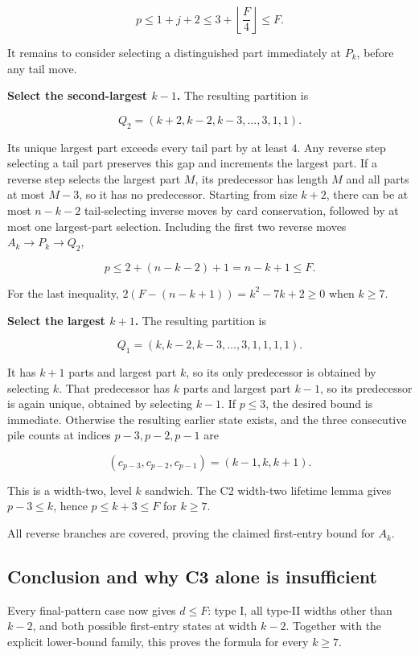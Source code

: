 \documentclass[11pt,a4paper]{article}
\begin{document}
\[
p\le1+j+2\le3+\left\lfloor\frac F4\right\rfloor\le F.
\]

It remains to consider selecting a distinguished part immediately at $P_k$, before any tail move.

\textbf{Select the second-largest $k-1$.} The resulting partition is

\[
Q_2=(k+2,k-2,k-3,\ldots,3,1,1).
\]

Its unique largest part exceeds every tail part by at least $4$. Any reverse step selecting a tail part preserves this gap and increments the largest part. If a reverse step selects the largest part $M$, its predecessor has length $M$ and all parts at most $M-3$, so it has no predecessor. Starting from size $k+2$, there can be at most $n-k-2$ tail-selecting inverse moves by card conservation, followed by at most one largest-part selection. Including the first two reverse moves $A_k\to P_k\to Q_2$,

\[
p\le2+(n-k-2)+1=n-k+1\le F.
\]

For the last inequality, $2(F-(n-k+1))=k^2-7k+2\ge0$ when $k\ge7$.

\textbf{Select the largest $k+1$.} The resulting partition is

\[
Q_1=(k,k-2,k-3,\ldots,3,1,1,1,1).
\]

It has $k+1$ parts and largest part $k$, so its only predecessor is obtained by selecting $k$. That predecessor has $k$ parts and largest part $k-1$, so its predecessor is again unique, obtained by selecting $k-1$. If $p\le3$, the desired bound is immediate. Otherwise the resulting earlier state exists, and the three consecutive pile counts at indices $p-3,p-2,p-1$ are

\[
(c_{p-3},c_{p-2},c_{p-1})=(k-1,k,k+1).
\]

This is a width-two, level $k$ sandwich. The C2 width-two lifetime lemma gives $p-3\le k$, hence $p\le k+3\le F$ for $k\ge7$.

All reverse branches are covered, proving the claimed first-entry bound for $A_k$.

\subsection{Conclusion and why C3 alone is insufficient}

Every final-pattern case now gives $d\le F$: type I, all type-II widths other than $k-2$, and both possible first-entry states at width $k-2$. Together with the explicit lower-bound family, this proves the formula for every $k\ge7$.
\end{document}
